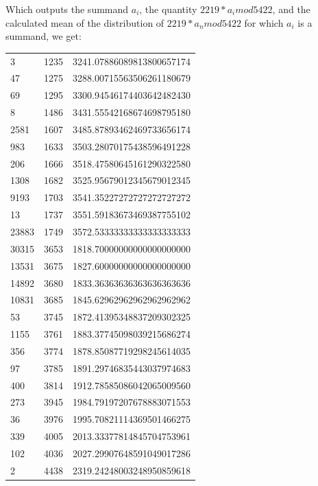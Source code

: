 \documentclass{article}
\theoremstyle{definition}
\theoremstyle{remark}
\numberwithin{equation}{section}
\begin{document}
{%


Which outputs the summand $a_i$, the quantity $2219*a_i mod 5422$,
and the calculated mean of the distribution of $2219*a_n mod 5422$ for
which $a_i$ is a summand, we get:

\begin{tabular}{lll}
3	&1235	&3241.07886089813800657174\\
47	&1275	&3288.00715563506261180679\\
69	&1295	&3300.94546174403642482430\\
8	&1486	&3431.55542168674698795180\\
2581	&1607	&3485.87893462469733656174\\
983	&1633	&3503.28070175438596491228\\
206	&1666	&3518.47580645161290322580\\
1308	&1682	&3525.95679012345679012345\\
9193	&1703	&3541.35227272727272727272\\
13	&1737	&3551.59183673469387755102\\
23883	&1749	&3572.53333333333333333333\\
30315	&3653	&1818.70000000000000000000\\
13531	&3675	&1827.60000000000000000000\\
14892	&3680	&1833.36363636363636363636\\
10831	&3685	&1845.62962962962962962962\\
53	&3745	&1872.41395348837209302325\\
1155	&3761	&1883.37745098039215686274\\
356	&3774	&1878.85087719298245614035\\
97	&3785	&1891.29746835443037974683\\
400	&3814	&1912.78585086042065009560\\
273	&3945	&1984.79197207678883071553\\
36	&3976	&1995.70821114369501466275\\
339	&4005	&2013.33377814845704753961\\
102	&4036	&2027.29907648591049017286\\
2	&4438	&2319.24248003248950859618
\end{tabular}

}
\end{document}
